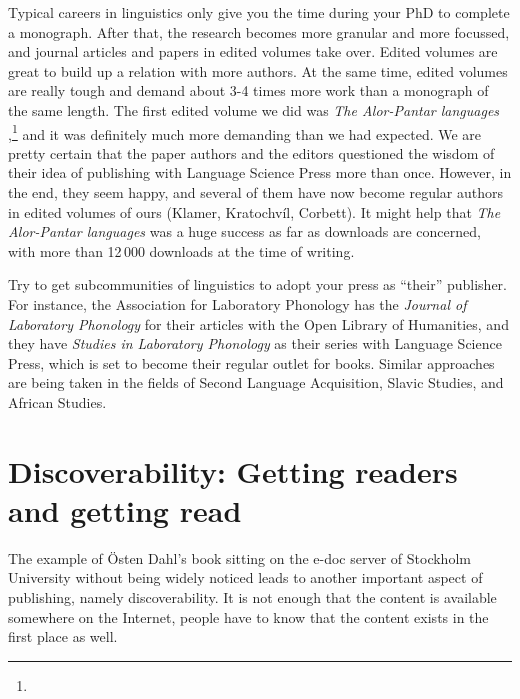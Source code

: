 \documentclass[nonflat,modfonts,output=book] {langsci/langscibook}
\begin{document}
Typical careers in linguistics only give you the time during your PhD to complete a monograph. After that, the research becomes more granular and more focussed, and journal articles and papers in edited volumes take over. Edited volumes are great to build up a relation with more authors. At the same time, edited volumes are really tough and demand about 3-4 times more work than a monograph of the same length. The first edited volume we did was \textit{The Alor-Pantar languages} \citep{Klamer2014},\footnote{} and it was definitely much more demanding than we had expected. We are pretty certain that the paper authors and the editors questioned the wisdom of their idea of publishing with Language Science Press more than once. However, in the end, they seem happy, and several of them have now become regular authors in edited volumes of ours (Klamer, Kratochvíl, Corbett). It might help that \textit{The Alor-Pantar languages} was a huge success as far as downloads are concerned, with more than 12\,000 downloads at the time of writing. 

Try to get subcommunities of linguistics to adopt your press as ``their'' publisher. For instance, the {Association for Laboratory Phonology} has the \textit{Journal of Laboratory Phonology} for their articles with the Open Library of Humanities, and they have \textit{Studies in Laboratory Phonology} as their series with Language Science Press, which is set to become their regular outlet for books. Similar approaches are being taken in the fields of Second Language Acquisition, Slavic Studies, and African Studies. 

\section{Discoverability: Getting readers and getting read}\label{sec:discoverability} 
The example of Östen Dahl's book sitting on the e-doc server of Stockholm University without being widely noticed leads to another important aspect of publishing, namely discoverability. It is not enough that the content is available somewhere on the Internet, people have to know that the content exists in the first place as well. 
\end{document}
